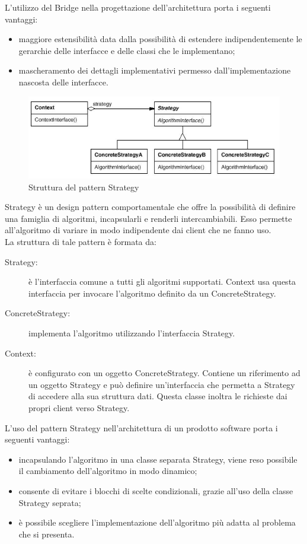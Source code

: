 		L’utilizzo del  Bridge nella progettazione dell’architettura porta i seguenti vantaggi:
		\begin{itemize}
			\item maggiore estensibilità data dalla possibilità di estendere indipendentemente le gerarchie delle interfacce e delle classi che le implementano;
			\item mascheramento dei dettagli implementativi permesso dall'implementazione nascosta delle interfacce.
		\end{itemize}

	 \label{app:strategy}
	\begin{figure}[H]\centering
    \includegraphics[scale=0.4]{SpecificaTecnica/Pics/Strategy}
    \caption{Struttura del pattern Strategy}
	\end{figure}
	Strategy è un design pattern comportamentale che offre la possibilità di definire una famiglia di algoritmi, incapsularli e renderli intercambiabili. Esso permette all'algoritmo di variare in modo indipendente dai client che ne fanno uso. \\
	La struttura di tale pattern è formata da:
	\begin{description}
		\item[Strategy:] è l'interfaccia comune a tutti gli algoritmi supportati. Context usa questa interfaccia per invocare l'algoritmo definito da un ConcreteStrategy.
		\item[ConcreteStrategy:] implementa l'algoritmo utilizzando l'interfaccia Strategy.
		\item[Context:] è configurato con un oggetto ConcreteStrategy. Contiene un riferimento ad un oggetto Strategy e può definire un'interfaccia che permetta a Strategy di accedere alla sua struttura dati. Questa classe inoltra le richieste dai propri client verso Strategy.
	\end{description}
		L'uso del pattern Strategy nell'architettura di un prodotto software porta i seguenti vantaggi:
		\begin{itemize}
			\item incapsulando l'algoritmo in una classe separata Strategy, viene reso possibile il cambiamento dell'algoritmo in modo dinamico;
			\item consente di evitare i blocchi di scelte condizionali, grazie all'uso della classe Strategy seprata;
			\item è possibile scegliere l'implementazione dell'algoritmo più adatta al problema che si presenta.
		\end{itemize}
